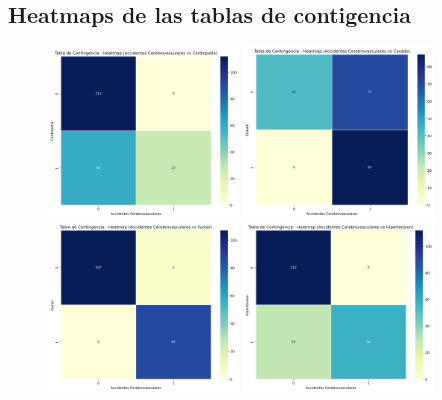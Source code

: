 \documentclass[a4paper, 12pt]{article}
\begin{document}
\subsection{Heatmaps de las tablas de contigencia}

\begin{figure}[H]
    \centering
    \includegraphics[width=0.45\textwidth]{img/Heatmap/Accidentes_Cardiopatia.png} \hspace{0.5cm}
    \includegraphics[width=0.45\textwidth]{img/Heatmap/Accidentes_Casado.png} \vspace{0.5cm}
    \vspace{0.3cm}
    \includegraphics[width=0.45\textwidth]{img/Heatmap/Accidentes_Fumar.png} \hspace{0.5cm}
    \includegraphics[width=0.45\textwidth]{img/Heatmap/Accidentes_Hipertension.png}
\end{figure}
\end{document}
